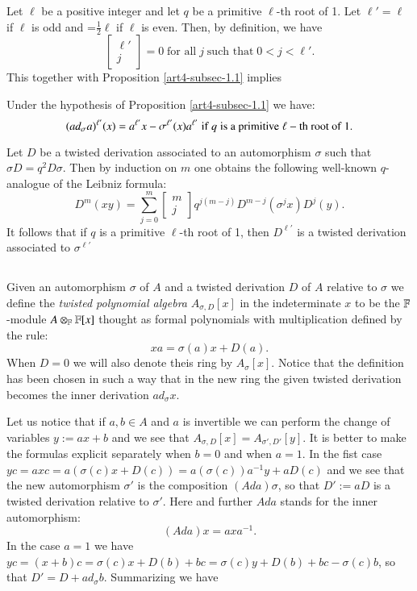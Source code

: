 Let $\ell$ be a positive integer and let $q$ be a primitive $\ell$-th root of 1. Let $\ell' = \ell$ if $\ell$ is odd  and =$\frac{1}{2}\ell$ if $\ell$ is even. Then, by definition, we have
$$
\begin{bmatrix}
\ell'\\
j
\end{bmatrix}  
=0\; \text{for all}\; j\; \text{such that} \;0 < j < \ell'.
$$
This together with Proposition \ref{art4-subsec-1.1} implies

\begin{coro*}
Under the hypothesis of Proposition \ref{art4-subsec-1.1} we have:
$$
(ad_{\sigma}a)^{\ell'}(x)= a^{\ell'}x-\sigma^{\ell'}(x)a^{\ell'}\; \text{\rm if}\; q\; \text{\rm is a primitive}\; \ell-\text{\rm th root of}\; 1.
$$ 
\end{coro*}

\begin{remark*}
Let $D$ be a twisted derivation associated to an automorphism $\sigma$ such that $\sigma D=q^{2}D\sigma$. Then by induction on $m$ one obtains the following well-known $q$-analogue of the Leibniz formula:
$$
D^{m}(xy) =\sum\limits_{j=0}^{m}
\begin{bmatrix}
m\\
j
\end{bmatrix}
q^{j(m-j)}D^{m-j}(\sigma^{j}x)D^{j}(y).
$$
It follows that if $q$  is  a primitive $\ell$-th root of 1, then $D^{\ell'}$ is a twisted derivation associated to $\sigma^{\ell'}$
 \end{remark*}

\subsection{}
Given an automorphism $\sigma$ of $A$ and a twisted derivation $D$ of $A$ relative to $\sigma$ we define the \textit{twisted polynomial algebra} $A_{\sigma, D}[x]$ in the indeterminate $x$ to be the $\mathbb{F}$-module $A\otimes_{\mathbb{F}}\mathbb{F}[x]$
thought as formal polynomials with multiplication defined by the rule:\label{art4-subsec-1.2}
$$
xa = \sigma(a)x+ D(a).
$$
When $D=0$ we will also denote theis ring by $A_{\sigma}[x]$. Notice that the definition has been chosen in such a way that in the new ring the given twisted derivation becomes the inner derivation $ad_{\sigma}x$. 

Let us notice that if $a,b\in A$ and $a$ is invertible we can perform the change of variables $y:=ax+b$ and we see that $A_{\sigma, D}[x]=A_{\sigma', D'}[y]$. It is better to make the formulas explicit separately when $b=0$ and when $a=1$. In the fist case $yc=axc=a(\sigma(c)x+ D(c)) =a(\sigma(c))a^{-1}y+aD(c)$ and we see that the new automorphism $\sigma'$ is the composition $(Ada)\sigma$, so that $D' :=aD$ is a twisted derivation relative to $\sigma'$. Here and further $Ada$ stands for the inner automorphism:
$$
(Ada)x = axa^{-1}.
$$
In the case $a=1$ we have $yc=(x+b)c =\sigma(c)x+ D(b)+bc =\sigma(c)y+D(b)+bc-\sigma(c)b$, so that $D'=D+ad_{\sigma}b$. Summarizing we have

